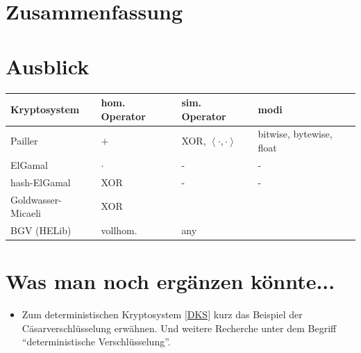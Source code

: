 \documentclass[12pt,a4paper]{scrartcl}	%
\begin{document}
\section{Zusammenfassung}
\section{Ausblick}








\begin{center}
	\begin{tabular}{ | l | l | l | p{5cm} |}
	 	\hline
 		Kryptosystem & hom. Operator & sim. Operator & modi \\ \hline
		Pailler & $+$ & XOR, $\left\langle\cdot,\cdot \right\rangle$  & bitwise, bytewise, float \\ \hline
		ElGamal & $\cdot$ & -  & - \\ \hline
		hash-ElGamal & XOR &  - & - \\ \hline
		Goldwasser-Micaeli & XOR & & \\ \hline
	    BGV (HELib) & vollhom. & any& \\ \hline
	\end{tabular}
\end{center}


\newpage
\section*{Was man noch ergänzen könnte...}
\begin{itemize}
	\item Zum deterministischen Kryptosystem \ref{DKS} kurz das Beispiel der Cäsarverschlüsselung erwähnen. Und weitere Recherche unter dem Begriff \enquote{deterministische Verschlüsselung}.
\end{itemize}


\newpage

\small
\end{document}
